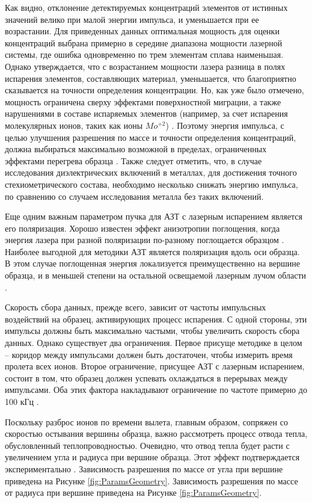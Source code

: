 Как видно, отклонение детектируемых концентраций элементов от истинных значений велико при малой энергии импульса, и уменьшается при ее возрастании. Для приведенных данных оптимальная мощность для оценки концентраций выбрана примерно в середине диапазона мощности лазерной системы, где ошибка одновременно по трем элементам сплава наименьшая. Однако утверждается, что с возрастанием мощности лазера разница в полях испарения элементов, составляющих материал, уменьшается, что благоприятно сказывается на точности определения концентрации. Но, как уже было отмечено, мощность ограничена сверху эффектами поверхностной миграции, а также нарушениями в составе испаряемых элементов (например, за счет испарения молекулярных ионов, таких как ионы $Mo^{+2}$) \cite{Tu15}. Поэтому энергия импульса, с целью улучшения разрешения по массе и точности определения концентраций, должна выбираться максимально возможной в пределах, ограниченных эффектами перегрева образца \cite{Tu15}. Также следует отметить, что, в случае исследования диэлектрических включений в металлах, для достижения точного стехиометрического состава, необходимо несколько снижать энергию импульса, по сравнению со случаем исследования металла без таких включений\cite{LarsonBOOK}.

Еще одним важным параметром пучка для АЗТ с лазерным испарением является его поляризация. Хорошо известен эффект анизотропии поглощения, когда энергия лазера при разной поляризации по-разному поглощается образцом \cite{Houard10,GaultBOOK}. Наиболее выгодной для методики АЗТ является поляризация вдоль оси образца. В этом случае поглощенная энергия локализуется преимущественно на вершине образца, и в меньшей степени на остальной освещаемой лазерным лучом области \cite{Houard10}.

Скорость сбора данных, прежде всего, зависит от частоты импульсных воздействий на образец, активирующих процесс испарения. С одной стороны, эти импульсы должны быть максимально частыми, чтобы увеличить скорость сбора данных. Однако существует два ограничения. Первое присуще методике в целом – коридор между импульсами должен быть достаточен, чтобы измерить время пролета всех ионов. Второе ограничение, присущее АЗТ с лазерным испарением, состоит в том, что образец должен успевать охлаждаться в перерывах между импульсами. Оба этих фактора накладывают ограничение по частоте примерно до 100 кГц \cite{Cerezo07}.

Поскольку разброс ионов по времени вылета, главным образом, сопряжен со скоростью остывания вершины образца, важно рассмотреть процесс отвода тепла, обусловленный теплопроводностью. Очевидно, что отвод тепла будет расти с увеличением угла и радиуса при вершине образца. Этот эффект подтверждается экспериментально \cite{Arnoldi12}. Зависимость разрешения по массе от угла при вершине приведена на Рисунке \cref{fig:ParamsGeometry}. Зависимость разрешения по массе от радиуса при вершине приведена на Рисунке \cref{fig:ParamsGeometry}.

